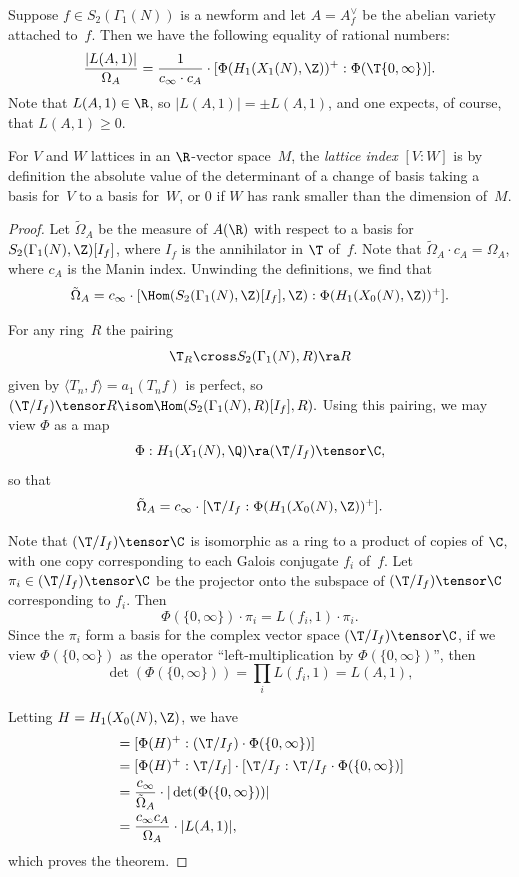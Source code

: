\documentclass{report}
\begin{document}
\begin{theorem}\label{thm:lratio}
  Suppose $f\in S_2(\Gamma_1(N))$ is a newform and let $A=A_f^{\vee}$
  be the abelian variety attached to~$f$. Then we have the
  following equality of rational numbers:
$$
  \frac{|L(A,1)|}{\Omega_A}  =
\frac{1}{c_\infty \cdot c_A}\cdot
             [ \Phi(H_1(X_1(N),\Z))^+ : \Phi(\T\{0,\infty\})].
$$
Note that $L(A,1)\in\R$, so $|L(A,1)|=\pm L(A,1)$, and one expects, of course,
that $L(A,1)\geq 0$.
\end{theorem}
For $V$ and $W$ lattices in an $\R$-vector space~$M$, the {\em lattice index}
$[V:W]$ is by definition the absolute value of the determinant of a
change of basis taking a basis for~$V$ to a basis for~$W$, or $0$ if
$W$ has rank smaller than the dimension of~$M$.
\begin{proof}[Proof]
Let
$\tilde{\Omega}_A$ be
the measure of $A(\R)$ with respect to a basis
for $S_2(\Gamma_1(N),\Z)[I_f]$, where
$I_f$ is the annihilator in $\T$ of~$f$.
Note that
$\tilde{\Omega}_A \cdot c_A = \Omega_A$,
where $c_A$ is the Manin index.
Unwinding the definitions, we find that
$$
\tilde{\Omega}_A
  = c_\infty \cdot [\Hom(S_2(\Gamma_1(N),\Z)[I_f],\Z) : \Phi(H_1(X_0(N),\Z))^+].
$$

For any ring~$R$ the pairing
$$\T_R \cross S_2(\Gamma_1(N),R) \ra R$$
given by $\langle T_n, f \rangle = a_1(T_n f)$
is perfect, so
$
 (\T/I_f)\tensor R \isom \Hom(S_2(\Gamma_1(N),R)[I_f],R).
$
Using this pairing, we may view $\Phi$ as a map
$$
  \Phi : H_1(X_1(N),\Q) \ra (\T/I_f)\tensor \C,
$$
so that
$$
  \tilde{\Omega}_A = c_\infty \cdot [\T/I_f : \Phi(H_1(X_0(N),\Z))^+].
$$

Note that $(\T/I_f)\tensor\C$ is isomorphic as a ring to a product of
copies of $\C$, with one copy corresponding to each Galois conjugate $f_i$ of~$f$.
Let $\pi_i\in (\T/I_f)\tensor\C$ be the
projector onto
the subspace of $(\T/I_f)\tensor\C$ corresponding to $f_i$.
Then
$$\Phi(\{0,\infty\})\cdot \pi_i = L(f_i,1)\cdot \pi_i.$$
Since the $\pi_i$ form a basis for the complex vector space $(\T/I_f)\tensor\C$,
if we view $\Phi(\{0,\infty\})$ as the operator ``left-multiplication
by $\Phi(\{0,\infty\})$'', then
$$
 \det(\Phi(\{0,\infty\})) = \prod_i L(f_i,1) = L(A,1),
$$

Letting $H = H_1(X_0(N),\Z)$, we have
\begin{align*}
[\Phi(H)^+ : \Phi(\T \{0,\infty\})] &= [\Phi(H)^+ : (\T/I_f) \cdot \Phi(\{0,\infty\}) ] \\
       &= [\Phi(H)^+ : \T/I_f] \cdot [\T/I_f : \T/I_f\cdot \Phi(\{0,\infty\})]\\
       &= \frac{c_\infty}{\tilde{\Omega}_A} \cdot |\det(\Phi(\{0,\infty\}))|\\
       &= \frac{c_\infty c_A}{\Omega_A} \cdot |L(A,1)|,
\end{align*}
which proves the theorem.

\end{proof}
\end{document}
